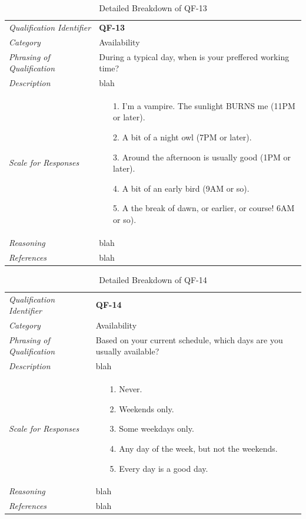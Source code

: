 \documentclass[12pt,letterpaper]{article}
\begin{document}
\begin{table}[H]
	\caption{Detailed Breakdown of QF-13}
	\begin{tabu} to 
		\toprule
		Qualification Identifier & {\bf QF-13}\\
		Category & Availability \\
		Phrasing of Qualification & During a typical day, when is your preffered working time? \\
		Description & blah\\
		Scale for Responses &
		\begin{minipage}[t]{\linewidth}
			\begin{enumerate}
				\item[1.] I'm a vampire. The sunlight BURNS me (11PM or later).
				\item[2.] A bit of a night owl (7PM or later).
				\item[3.] Around the afternoon is usually good (1PM or later).
				\item[4.] A bit of an early bird (9AM or so).
				\item[5.] A the break of dawn, or earlier, or course! 6AM or so).
			\end{enumerate}
		\end{minipage}\\
		Reasoning & blah\\
		References & blah\\
		\toprule
	\end{tabu}
\end{table}

\begin{table}[H]
	\caption{Detailed Breakdown of QF-14}
	\begin{tabu} to 
		\toprule
		Qualification Identifier & {\bf QF-14}\\
		Category & Availability \\
		Phrasing of Qualification & Based on your current schedule, which days are you usually available? \\
		Description & blah\\
		Scale for Responses &
		\begin{minipage}[t]{\linewidth}
			\begin{enumerate}
				\item[1.] Never.
				\item[2.] Weekends only.
				\item[3.] Some weekdays only.
				\item[4.] Any day of the week, but not the weekends.
				\item[5.] Every day is a good day.
			\end{enumerate}
		\end{minipage}\\
		Reasoning & blah\\
		References & blah\\
		\toprule
	\end{tabu}
\end{table}
\end{document}
